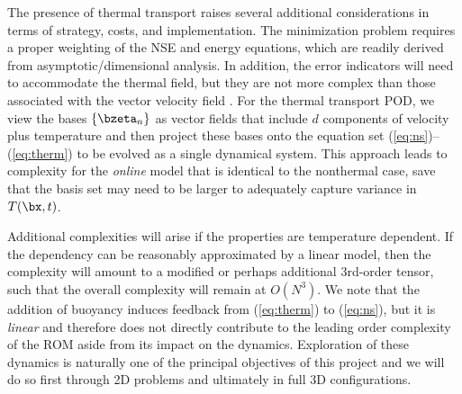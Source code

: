 The presence of thermal transport raises several additional considerations
in terms of strategy, costs, and implementation.   The minimization
problem requires a proper weighting of the NSE and energy equations, which
are readily derived from asymptotic/dimensional analysis.   In addition, the
error indicators will need to accommodate the thermal field, but they
are not more complex than those associated with the vector velocity
field \cite{fick18,patera05}.
  For the thermal transport POD,
  we view the bases $\{\bzeta_n\}$ as vector fields that include $d$
components of velocity plus temperature and then project these bases onto the
equation set (\ref{eq:ns})--(\ref{eq:therm}) to be evolved as a single
dynamical system.  This approach leads to complexity for the {\em online} 
model that is identical to the nonthermal case, save that the basis set may
need to be larger to adequately capture variance in $T(\bx,t)$.

 Additional complexities will arise if the properties are temperature
dependent.  If the dependency can be reasonably approximated 
by a linear model, then the complexity will amount to a modified
or perhaps additional 3rd-order tensor, such that the overall complexity
will remain at $O(N^3)$.
  We note that the addition of buoyancy induces feedback from (\ref{eq:therm})
to (\ref{eq:ns}), but it is {\em linear} and therefore does not directly
contribute to the leading order complexity of the ROM aside from its
impact on the dynamics.   Exploration of these
dynamics is naturally one of the principal objectives of this project and we
will do so first through 2D problems and ultimately in full 3D configurations.

